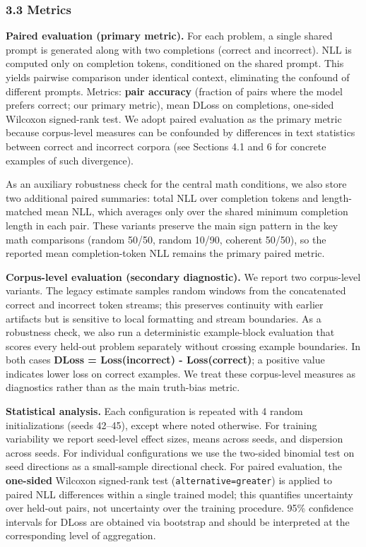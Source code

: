 \documentclass[
  11pt,
]{article}
\begin{document}
\subsubsection{3.3 Metrics}\label{metrics}

\textbf{Paired evaluation (primary metric).} For each problem, a single
shared prompt is generated along with two completions (correct and
incorrect). NLL is computed only on completion tokens, conditioned on
the shared prompt. This yields pairwise comparison under identical
context, eliminating the confound of different prompts. Metrics:
\textbf{pair accuracy} (fraction of pairs where the model prefers
correct; our primary metric), mean DLoss on completions, one-sided
Wilcoxon signed-rank test. We adopt paired evaluation as the primary
metric because corpus-level measures can be confounded by differences in
text statistics between correct and incorrect corpora (see Sections 4.1
and 6 for concrete examples of such divergence).

As an auxiliary robustness check for the central math conditions, we
also store two additional paired summaries: total NLL over completion
tokens and length-matched mean NLL, which averages only over the shared
minimum completion length in each pair. These variants preserve the main
sign pattern in the key math comparisons (random 50/50, random 10/90,
coherent 50/50), so the reported mean completion-token NLL remains the
primary paired metric.

\textbf{Corpus-level evaluation (secondary diagnostic).} We report two
corpus-level variants. The legacy estimate samples random windows from
the concatenated correct and incorrect token streams; this preserves
continuity with earlier artifacts but is sensitive to local formatting
and stream boundaries. As a robustness check, we also run a
deterministic example-block evaluation that scores every held-out
problem separately without crossing example boundaries. In both cases
\textbf{DLoss = Loss(incorrect) - Loss(correct)}; a positive value
indicates lower loss on correct examples. We treat these corpus-level
measures as diagnostics rather than as the main truth-bias metric.

\textbf{Statistical analysis.} Each configuration is repeated with 4
random initializations (seeds 42--45), except where noted otherwise. For
training variability we report seed-level effect sizes, means across
seeds, and dispersion across seeds. For individual configurations we use
the two-sided binomial test on seed directions as a small-sample
directional check. For paired evaluation, the \textbf{one-sided}
Wilcoxon signed-rank test
(\texttt{alternative=\textquotesingle{}greater\textquotesingle{}}) is
applied to paired NLL differences within a single trained model; this
quantifies uncertainty over held-out pairs, not uncertainty over the
training procedure. 95\% confidence intervals for DLoss are obtained via
bootstrap and should be interpreted at the corresponding level of
aggregation.
\end{document}
